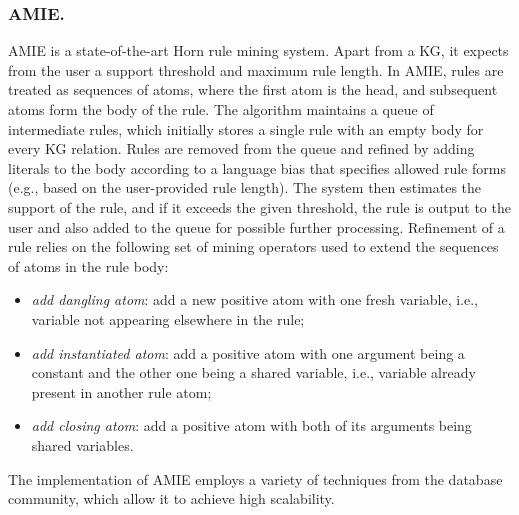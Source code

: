 \subsubsection{AMIE.}
AMIE \cite{amie} is a state-of-the-art Horn rule mining system.
Apart from a KG, it expects from the user a support threshold and maximum
rule length. In AMIE, rules are treated as sequences of atoms, where the first atom is the head, and subsequent atoms form the body of the rule. The algorithm maintains a queue of intermediate rules, which initially stores a single rule with an empty body for every KG relation. 
Rules are removed from the queue and refined by adding literals to the body according to a language bias that specifies allowed rule forms (e.g., based on the user-provided rule length). The system then estimates the support of the rule, and if it exceeds the given threshold, the rule is output to the user and also added to the queue for
possible further processing.
Refinement of a rule relies on the following set of mining operators used to extend the sequences of atoms in the rule body:
\begin{itemize}
\item \textit{add dangling atom}: add a new positive atom with one fresh variable, i.e., variable not appearing elsewhere in the rule;
\item \textit{add instantiated atom}: add a positive atom with one argument being a constant and the other one being a shared variable, i.e., variable already present in another rule atom;
\item \textit{add closing atom}:  add a positive atom with both of its arguments being shared variables.

\end{itemize}

The implementation of AMIE employs a variety of techniques from the database community, which allow it to achieve high scalability.

